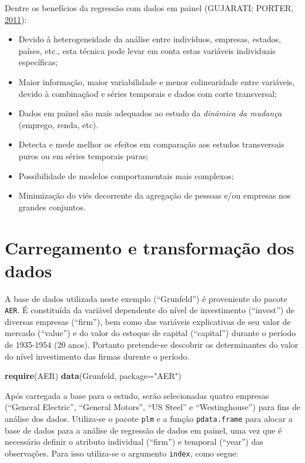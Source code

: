 \documentclass[12pt,brazil,oneside]{book}
\newenvironment{Shaded}{\begin{snugshade}}{\end{snugshade}}
\newcommand{\DataTypeTok}[1]{\textcolor[rgb]{0.13,0.29,0.53}{#1}}
\newcommand{\KeywordTok}[1]{\textcolor[rgb]{0.13,0.29,0.53}{\textbf{#1}}}
\newcommand{\NormalTok}[1]{#1}
\newcommand{\StringTok}[1]{\textcolor[rgb]{0.31,0.60,0.02}{#1}}
\begin{document}
Dentre os benefícios da regressão com dados em painel (GUJARATI; PORTER,
\protect\hyperlink{ref-Gujarati2011}{2011}):

\begin{itemize}
\item
  Devido à heterogeneidade da análise entre indivíduos, empresas,
  estados, países, etc., esta técnica pode levar em conta estas
  variáveis individuais específicas;
\item
  Maior informação, maior variabilidade e menor colinearidade entre
  variáveis, devido à combinaçãod e séries temporais e dados com corte
  transversal;
\item
  Dados em painel são mais adequados ao estudo da \emph{dinâmica da
  mudança} (emprego, renda, etc).
\item
  Detecta e mede melhor os efeitos em comparação aos estudos
  transversais puros ou em séries temporais puras;
\item
  Possibilidade de modelos comportamentais mais complexos;
\item
  Minimização do viés decorrente da agregação de pessoas e/ou empresas
  nos grandes conjuntos.
\end{itemize}

\hypertarget{carregamento-e-transformacao-dos-dados}{%
\section{Carregamento e transformação dos
dados}\label{carregamento-e-transformacao-dos-dados}}

A base de dados utilizada neste exemplo (``Grunfeld'') é proveniente do
pacote \texttt{AER}. É constituída da variável dependente do nível de
investimento (``invest'') de diversas empresas (``firm''), bem como das
variáveis explicativas de seu valor de mercado (``value'') e do valor do
estoque de capital (``capital'') durante o período de 1935-1954 (20
anos). Portanto pretende-se descobrir os determinantes do valor do nível
investimento das firmas durente o período.

\begin{Shaded}
\begin{Highlighting}[]
\KeywordTok{require}\NormalTok{(AER) }
\KeywordTok{data}\NormalTok{(Grunfeld, }\DataTypeTok{package=}\StringTok{"AER"}\NormalTok{)}
\end{Highlighting}
\end{Shaded}

Após carregada a base para o estudo, serão selecionadas quatro empresas
(``General Electric'', ``General Motors'', ``US Steel'' e
``Westinghouse'') para fins de análise dos dados. Utiliza-se o pacote
\texttt{plm} e a função \texttt{pdata.frame} para alocar a base de dados
para a análise de regressão de dados em painel, uma vez que é necessário
definir o atributo individual (``firm'') e temporal (``year'') das
observações. Para isso utiliza-se o argumento \texttt{index}, como
segue:
\end{document}
